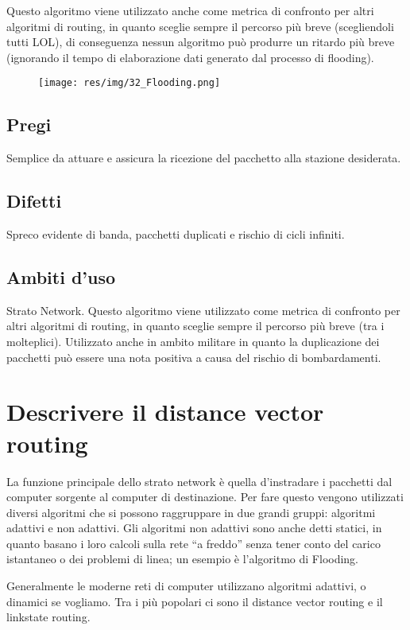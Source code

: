 Questo algoritmo viene utilizzato anche come metrica di confronto per altri algoritmi di routing, in quanto sceglie sempre il percorso più breve (scegliendoli tutti LOL), di conseguenza nessun algoritmo può produrre un ritardo più breve (ignorando il tempo di elaborazione dati generato dal processo di flooding).

\begin{figure}[H]
\centering
\texttt{[image: res/img/32\_Flooding.png]}
\end{figure}

\subsection{Pregi}
Semplice da attuare e assicura la ricezione del pacchetto alla stazione desiderata.

\subsection{Difetti}
Spreco evidente di banda, pacchetti duplicati e rischio di cicli infiniti.

\subsection{Ambiti d'uso}
Strato Network.
Questo algoritmo viene utilizzato come metrica di confronto per altri algoritmi di routing, in quanto sceglie sempre il percorso più breve (tra i molteplici).
Utilizzato anche in ambito militare in quanto la duplicazione dei pacchetti può essere una nota positiva a causa del rischio di bombardamenti.

\section{Descrivere il distance vector routing}

La funzione principale dello strato network è quella d'instradare i pacchetti dal computer sorgente al computer di destinazione. Per fare questo vengono utilizzati diversi algoritmi che si possono raggruppare in due grandi gruppi: algoritmi adattivi e non adattivi. Gli algoritmi non adattivi sono anche detti statici, in quanto basano i loro calcoli sulla rete “a freddo” senza tener conto del carico istantaneo o dei problemi di linea; un esempio è l'algoritmo di Flooding.

Generalmente le moderne reti di computer utilizzano algoritmi adattivi, o dinamici se vogliamo. Tra i più popolari ci sono il distance vector routing e il linkstate routing.

